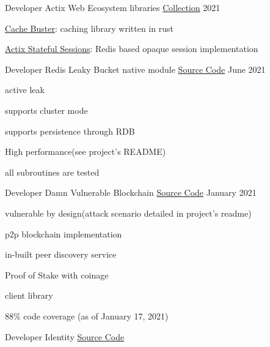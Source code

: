 \begin{cventries}
    \cventry
    {Developer} %
    {Actix Web Ecosystem libraries} %
    {\href{https://github.com/realaravinth?tab=repositories&q=actix&type=&language=&sort=}{Collection}} %
    {2021} %
    {
     \begin{cvitems} %
      \item {{\href{https://github.com/realaravinth/cache-buster}{Cache Buster}}: caching library written in rust}
	   \item {{\href{https://github.com/realaravinth/actix-stateful-sessions}{Actix Stateful Sessions}}: Redis based opaque session implementation}
      \end{cvitems}
    }
  \cventry
    {Developer} %
    {Redis Leaky Bucket native module} %
    {\href{https://github.com/realaravinth/redis-leaky-bucket}{Source Code}} %
    {June 2021} %
    {
      \begin{cvitems} %
      \item {active leak}
        \item {supports cluster mode}
        \item {supports persistence through RDB}
        \item {High performance(see project's README)}
    	\item {all subroutines are tested}
      \end{cvitems}
    }
  \cventry
    {Developer} %
    {Damn Vulnerable Blockchain} %
    {\href{https://github.com/realaravinth/damn-vuln-blockchain}{Source Code}} %
    {January 2021} %
    {
      \begin{cvitems} %
      \item {vulnerable by design(attack scenario detailed in project's readme)}
        \item {p2p blockchain implementation}
        \item {in-built peer discovery service}
        \item {Proof of Stake with coinage}
        \item {client library}
		\item {88\% code coverage  (as of January 17, 2021)}
      \end{cvitems}
    }
  \cventry
    {Developer} %
    {Identity} %
    {\href{https://github.com/shuttlecraft/identity}{Source Code}} %

\end{cventries}
